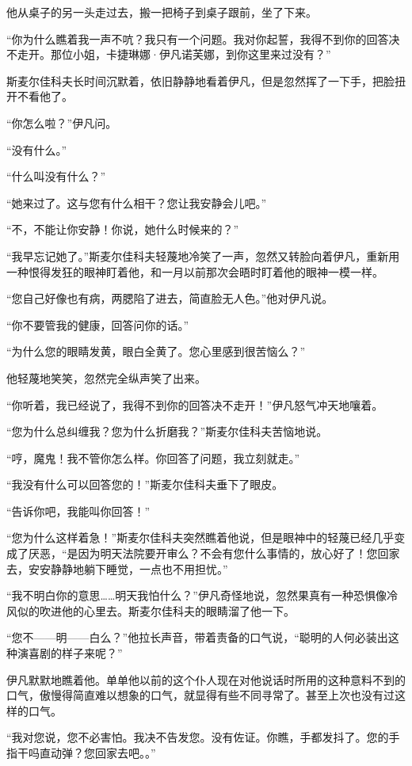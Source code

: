\par 他从桌子的另一头走过去，搬一把椅子到桌子跟前，坐了下来。
\par “你为什么瞧着我一声不吭？我只有一个问题。我对你起誓，我得不到你的回答决不走开。那位小姐，卡捷琳娜·伊凡诺芙娜，到你这里来过没有？”
\par 斯麦尔佳科夫长时间沉默着，依旧静静地看着伊凡，但是忽然挥了一下手，把脸扭开不看他了。
\par “你怎么啦？”伊凡问。
\par “没有什么。”
\par “什么叫没有什么？”
\par “她来过了。这与您有什么相干？您让我安静会儿吧。”
\par “不，不能让你安静！你说，她什么时候来的？”
\par “我早忘记她了。”斯麦尔佳科夫轻蔑地冷笑了一声，忽然又转脸向着伊凡，重新用一种恨得发狂的眼神盯着他，和一月以前那次会晤时盯着他的眼神一模一样。
\par “您自己好像也有病，两腮陷了进去，简直脸无人色。”他对伊凡说。
\par “你不要管我的健康，回答问你的话。”
\par “为什么您的眼睛发黄，眼白全黄了。您心里感到很苦恼么？”
\par 他轻蔑地笑笑，忽然完全纵声笑了出来。
\par “你听着，我已经说了，我得不到你的回答决不走开！”伊凡怒气冲天地嚷着。
\par “您为什么总纠缠我？您为什么折磨我？”斯麦尔佳科夫苦恼地说。
\par “哼，魔鬼！我不管你怎么样。你回答了问题，我立刻就走。”
\par “我没有什么可以回答您的！”斯麦尔佳科夫垂下了眼皮。
\par “告诉你吧，我能叫你回答！”
\par “您为什么这样着急！”斯麦尔佳科夫突然瞧着他说，但是眼神中的轻蔑已经几乎变成了厌恶，“是因为明天法院要开审么？不会有您什么事情的，放心好了！您回家去，安安静静地躺下睡觉，一点也不用担忧。”
\par “我不明白你的意思……明天我怕什么？”伊凡奇怪地说，忽然果真有一种恐惧像冷风似的吹进他的心里去。斯麦尔佳科夫的眼睛溜了他一下。
\par “您不——明——白么？”他拉长声音，带着责备的口气说，“聪明的人何必装出这种演喜剧的样子来呢？”
\par 伊凡默默地瞧着他。单单他以前的这个仆人现在对他说话时所用的这种意料不到的口气，傲慢得简直难以想象的口气，就显得有些不同寻常了。甚至上次也没有过这样的口气。
\par “我对您说，您不必害怕。我决不告发您。没有佐证。你瞧，手都发抖了。您的手指干吗直动弹？您回家去吧。。”
